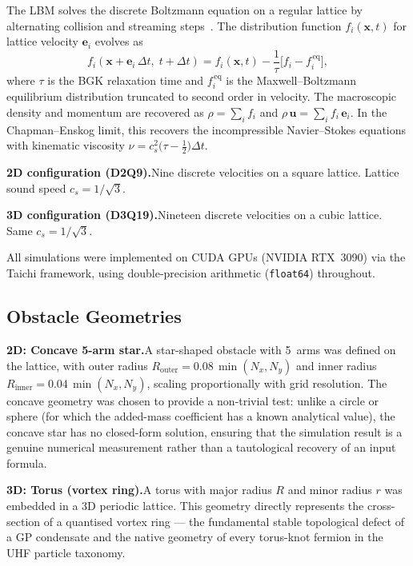 \documentclass[reprint,amsmath,amssymb,aps,pre,floatfix]{revtex4-2}
\begin{document}
The LBM solves the discrete Boltzmann equation on a regular lattice by
alternating collision and streaming steps~\cite{Chen1998,Krueger2017}.  The
distribution function $f_i(\mathbf{x},t)$ for lattice velocity
$\mathbf{e}_i$ evolves as
\begin{equation}
f_i(\mathbf{x}+\mathbf{e}_i\,\Delta t,\;t+\Delta t)
  = f_i(\mathbf{x},t)
  - \frac{1}{\tau}\bigl[f_i - f_i^{\,\mathrm{eq}}\bigr],
\label{eq:lbm}
\end{equation}
where $\tau$ is the BGK relaxation time and $f_i^{\,\mathrm{eq}}$ is the
Maxwell--Boltzmann equilibrium distribution truncated to second order in
velocity.  The macroscopic density and momentum are recovered as
$\rho=\sum_i f_i$ and $\rho\,\mathbf{u}=\sum_i f_i\,\mathbf{e}_i$.  In
the Chapman--Enskog limit, this recovers the incompressible Navier--Stokes
equations with kinematic viscosity
$\nu=c_s^{2}\bigl(\tau-\tfrac{1}{2}\bigr)\Delta t$.

\textbf{2D configuration (D2Q9).}\quad Nine discrete velocities on a square
lattice.  Lattice sound speed $c_s=1/\sqrt{3}$.

\textbf{3D configuration (D3Q19).}\quad Nineteen discrete velocities on a
cubic lattice.  Same $c_s=1/\sqrt{3}$.

All simulations were implemented on CUDA GPUs (NVIDIA RTX~3090) via the
Taichi framework, using double-precision arithmetic (\texttt{float64})
throughout.

\subsection{Obstacle Geometries}
\label{sec:geom}

\textbf{2D: Concave 5-arm star.}\quad A star-shaped obstacle with 5~arms
was defined on the lattice, with outer radius
$R_{\mathrm{outer}}=0.08\,\min(N_x,N_y)$ and inner radius
$R_{\mathrm{inner}}=0.04\,\min(N_x,N_y)$, scaling proportionally with
grid resolution.  The concave geometry was chosen to provide a non-trivial
test: unlike a circle or sphere (for which the added-mass coefficient has a
known analytical value), the concave star has no closed-form solution,
ensuring that the simulation result is a genuine numerical measurement
rather than a tautological recovery of an input formula.

\textbf{3D: Torus (vortex ring).}\quad A torus with major radius $R$ and
minor radius $r$ was embedded in a 3D periodic lattice.  This geometry
directly represents the cross-section of a quantised vortex ring --- the
fundamental stable topological defect of a GP condensate and the native
geometry of every torus-knot fermion in the UHF particle taxonomy.
\end{document}
